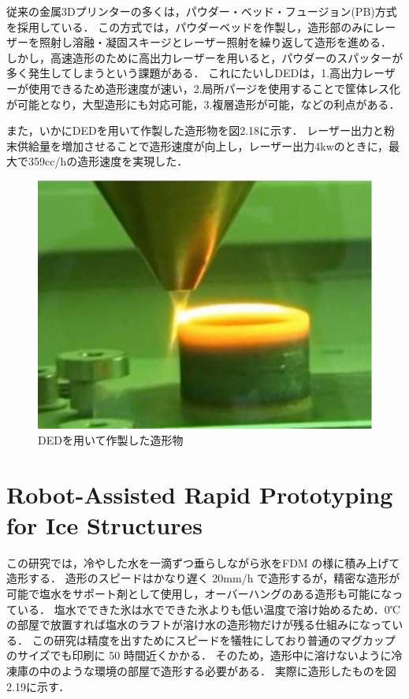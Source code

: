 従来の金属3Dプリンターの多くは，パウダー・ベッド・フュージョン(PB)方式を採用している．
この方式では，パウダーベッドを作製し，造形部のみにレーザーを照射し溶融・凝固スキージとレーザー照射を繰り返して造形を進める．
しかし，高速造形のために高出力レーザーを用いると，パウダーのスパッターが多く発生してしまうという課題がある．
これにたいしDEDは，1.高出力レーザーが使用できるため造形速度が速い，2.局所パージを使用することで筐体レス化が可能となり，大型造形にも対応可能，3.複層造形が可能，などの利点がある．

また，いかにDEDを用いて作製した造形物を図2.18に示す．
レーザー出力と粉末供給量を増加させることで造形速度が向上し，レーザー出力4kwのときに，最大で359cc/hの造形速度を実現した．

\begin{figure}[H]
  \centering
  \includegraphics[width=11truecm]{./fig/kinnzoku2.jpg}
  \caption{DEDを用いて作製した造形物}
  \label{fig:ferret}
\end{figure}



\section{Robot-Assisted Rapid Prototyping for Ice Structures\cite{ss}}
\label{sec:enum}
この研究では，冷やした水を一滴ずつ垂らしながら氷をFDM の様に積み上げて造形する．
造形のスピードはかなり遅く 20mm/h で造形するが，精密な造形が可能で塩水をサポート剤として使用し，オーバーハングのある造形も可能になっている．
塩水でできた氷は水でできた氷よりも低い温度で溶け始めるため．0℃ の部屋で放置すれば塩水のラフトが溶け水の造形物だけが残る仕組みになっている．
この研究は精度を出すためにスピードを犠牲にしており普通のマグカップのサイズでも印刷に 50 時間近くかかる．
そのため，造形中に溶けないように冷凍庫の中のような環境の部屋で造形する必要がある．
実際に造形したものを図2.19に示す．


